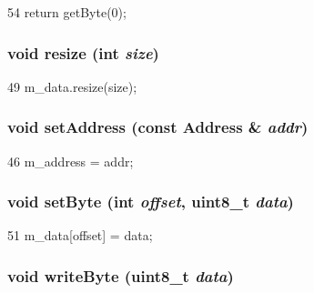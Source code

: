 \begin{DoxyCode}
54 { return getByte(0); }
\end{DoxyCode}
\hypertarget{classSubBlock_ada388d17b93c54a1a0f6edddbe0953ab}{
\subsubsection[{resize}]{\setlength{\rightskip}{0pt plus 5cm}void resize (int {\em size})}}
\label{classSubBlock_ada388d17b93c54a1a0f6edddbe0953ab}



\begin{DoxyCode}
49 {  m_data.resize(size); }
\end{DoxyCode}
\hypertarget{classSubBlock_a53120b1754f27e405338f9ab6e3408cc}{
\subsubsection[{setAddress}]{\setlength{\rightskip}{0pt plus 5cm}void setAddress (const {\bf Address} \& {\em addr})}}
\label{classSubBlock_a53120b1754f27e405338f9ab6e3408cc}



\begin{DoxyCode}
46 { m_address = addr; }
\end{DoxyCode}
\hypertarget{classSubBlock_a53ae5d405294f20035f269ab2e1c1748}{
\subsubsection[{setByte}]{\setlength{\rightskip}{0pt plus 5cm}void setByte (int {\em offset}, \/  uint8\_\-t {\em data})}}
\label{classSubBlock_a53ae5d405294f20035f269ab2e1c1748}



\begin{DoxyCode}
51 { m_data[offset] = data; }
\end{DoxyCode}
\hypertarget{classSubBlock_a1c4230046f3ab5a24fed43cb939ddb18}{
\subsubsection[{writeByte}]{\setlength{\rightskip}{0pt plus 5cm}void writeByte (uint8\_\-t {\em data})}}
\label{classSubBlock_a1c4230046f3ab5a24fed43cb939ddb18}



